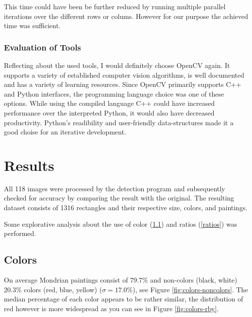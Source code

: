 \documentclass[serif,article,noparskip]{agse-thesis}
\begin{document}
This time could have been be further reduced by running multiple parallel
iterations over the different rows or colums. However for our purpose the
achieved time was sufficient.

\subsubsection{Evaluation of Tools}

Reflecting about the used tools, I would definitely choose OpenCV again. It
supports a variety of established computer vision algorithms, is well documented
and has a variety of learning resources. Since OpenCV primarily supports C++ and
Python interfaces, the programming language choice was one of these options.
While using the compiled language C++ could have increased performance over the
interpreted Python, it would also have decreased productivity.
Python's readibility and user-friendly data-structures made it a good choise for
an iterative development.

\section{Results} \label{results}

 All 118 images were processed by the detection program and subsequently checked
 for accuracy by comparing the result with the original. The resulting dataset
 consists of 1316 rectangles and their respective size, colors, and paintings.

Some explorative analysis about the use of color (\ref{color}) and ratios
(\ref{ratios}) was performed.

\subsection{Colors} \label{color}

On average Mondrian paintings consist of 79.7\%  and non-colors (black, white)
20.3\% colors (red, blue, yellow) ($\sigma = 17.0\%$), see Figure
\ref{fig:colors-noncolors}. The median percentage of each color appears to be
rather similar, the distribution of red however is more widespread as you can
see in Figure \ref{fig:colors-rby}.
\end{document}
